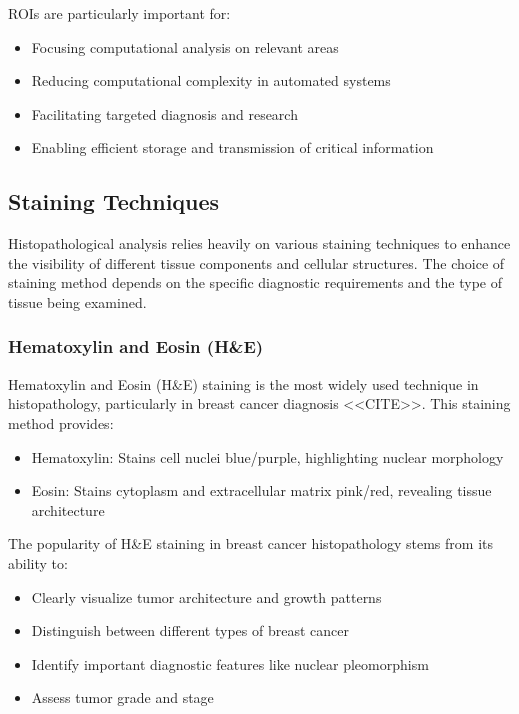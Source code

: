 \glspl{ROI} are particularly important for:
\begin{itemize}
  \item Focusing computational analysis on relevant areas
  \item Reducing computational complexity in automated systems
  \item Facilitating targeted diagnosis and research
  \item Enabling efficient storage and transmission of critical information
\end{itemize}

\subsection{Staining Techniques}

Histopathological analysis relies heavily on various staining
techniques to enhance the visibility of different tissue components
and cellular structures. The choice of staining method depends on the
specific diagnostic requirements and the type of tissue being examined.

\subsubsection{Hematoxylin and Eosin (H\&E)}

Hematoxylin and Eosin (H\&E) staining is the most widely used
technique in histopathology, particularly in breast cancer diagnosis
<<CITE>>. This staining method provides:

\begin{itemize}
  \item Hematoxylin: Stains cell nuclei blue/purple, highlighting
    nuclear morphology
  \item Eosin: Stains cytoplasm and extracellular matrix pink/red,
    revealing tissue architecture
\end{itemize}

The popularity of H\&E staining in breast cancer histopathology stems
from its ability to:
\begin{itemize}
  \item Clearly visualize tumor architecture and growth patterns
  \item Distinguish between different types of breast cancer
  \item Identify important diagnostic features like nuclear pleomorphism
  \item Assess tumor grade and stage
\end{itemize}

